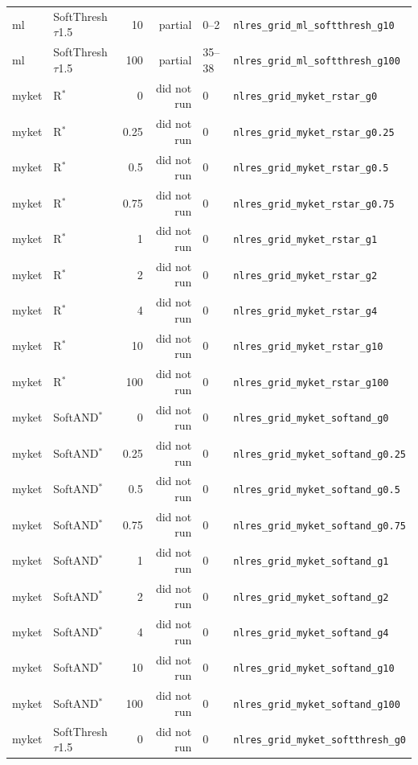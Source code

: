 \documentclass[10pt,a4paper]{article}
\begin{document}
{\begin{longtable}{llrrll}
ml & SoftThresh$\tau$1.5 & 10 & partial & 0--2 & \texttt{nlres\_grid\_ml\_softthresh\_g10} \\
ml & SoftThresh$\tau$1.5 & 100 & partial & 35--38 & \texttt{nlres\_grid\_ml\_softthresh\_g100} \\
myket & R$^*$ & 0 & did not run & 0 & \texttt{nlres\_grid\_myket\_rstar\_g0} \\
myket & R$^*$ & 0.25 & did not run & 0 & \texttt{nlres\_grid\_myket\_rstar\_g0.25} \\
myket & R$^*$ & 0.5 & did not run & 0 & \texttt{nlres\_grid\_myket\_rstar\_g0.5} \\
myket & R$^*$ & 0.75 & did not run & 0 & \texttt{nlres\_grid\_myket\_rstar\_g0.75} \\
myket & R$^*$ & 1 & did not run & 0 & \texttt{nlres\_grid\_myket\_rstar\_g1} \\
myket & R$^*$ & 2 & did not run & 0 & \texttt{nlres\_grid\_myket\_rstar\_g2} \\
myket & R$^*$ & 4 & did not run & 0 & \texttt{nlres\_grid\_myket\_rstar\_g4} \\
myket & R$^*$ & 10 & did not run & 0 & \texttt{nlres\_grid\_myket\_rstar\_g10} \\
myket & R$^*$ & 100 & did not run & 0 & \texttt{nlres\_grid\_myket\_rstar\_g100} \\
myket & SoftAND$^*$ & 0 & did not run & 0 & \texttt{nlres\_grid\_myket\_softand\_g0} \\
myket & SoftAND$^*$ & 0.25 & did not run & 0 & \texttt{nlres\_grid\_myket\_softand\_g0.25} \\
myket & SoftAND$^*$ & 0.5 & did not run & 0 & \texttt{nlres\_grid\_myket\_softand\_g0.5} \\
myket & SoftAND$^*$ & 0.75 & did not run & 0 & \texttt{nlres\_grid\_myket\_softand\_g0.75} \\
myket & SoftAND$^*$ & 1 & did not run & 0 & \texttt{nlres\_grid\_myket\_softand\_g1} \\
myket & SoftAND$^*$ & 2 & did not run & 0 & \texttt{nlres\_grid\_myket\_softand\_g2} \\
myket & SoftAND$^*$ & 4 & did not run & 0 & \texttt{nlres\_grid\_myket\_softand\_g4} \\
myket & SoftAND$^*$ & 10 & did not run & 0 & \texttt{nlres\_grid\_myket\_softand\_g10} \\
myket & SoftAND$^*$ & 100 & did not run & 0 & \texttt{nlres\_grid\_myket\_softand\_g100} \\
myket & SoftThresh$\tau$1.5 & 0 & did not run & 0 & \texttt{nlres\_grid\_myket\_softthresh\_g0} \\

\end{longtable}}
\end{document}
